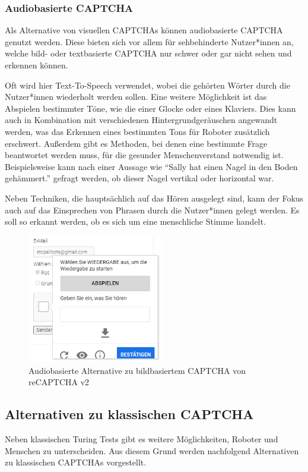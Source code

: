 \subsubsection*{Audiobasierte CAPTCHA}
Als Alternative von visuellen CAPTCHAs können audiobasierte CAPTCHA genutzt werden.
Diese bieten sich vor allem für sehbehinderte Nutzer*innen an, welche bild- oder textbasierte CAPTCHA nur schwer oder gar nicht sehen und erkennen können.

Oft wird hier Text-To-Speech verwendet, wobei die gehörten Wörter durch die Nutzer*innen wiederholt werden sollen.
Eine weitere Möglichkeit ist das Abspielen bestimmter Töne, wie die einer Glocke oder eines Klaviers. 
Dies kann auch in Kombination mit verschiedenen Hintergrundgeräuschen angewandt werden, was das Erkennen eines bestimmten Tons für Roboter zusätzlich erschwert.
Außerdem gibt es Methoden, bei denen eine bestimmte Frage beantwortet werden muss, für die gesunder Menschenverstand notwendig ist. 
Beispielsweise kann nach einer Aussage wie ``Sally hat einen Nagel in den Boden gehämmert.'' gefragt werden, ob dieser Nagel vertikal oder horizontal war. \cite[p.3]{commonsense}

Neben Techniken, die hauptsächlich auf das Hören ausgelegt sind, kann der Fokus auch auf das Einsprechen von Phrasen durch die Nutzer*innen gelegt werden.
Es soll so erkannt werden, ob es sich um eine menschliche Stimme handelt.
\cite[p.78]{surveyofresearch}

\begin{figure}[h!]
    \centering
    \includegraphics[width=6cm]{gfx/mygraphics/audio.png}
     \caption{Audiobasierte Alternative zu bildbasiertem CAPTCHA von reCAPTCHA v2}
      \label{fig:audio}
\end{figure}

\pagebreak

\subsection{Alternativen zu klassischen CAPTCHA}
\label{ch:basics:captcha:alternativen}
Neben klassischen Turing Tests gibt es weitere Möglichkeiten, Roboter und Menschen zu unterscheiden.
Aus diesem Grund werden nachfolgend Alternativen zu klassischen CAPTCHAs vorgestellt.

